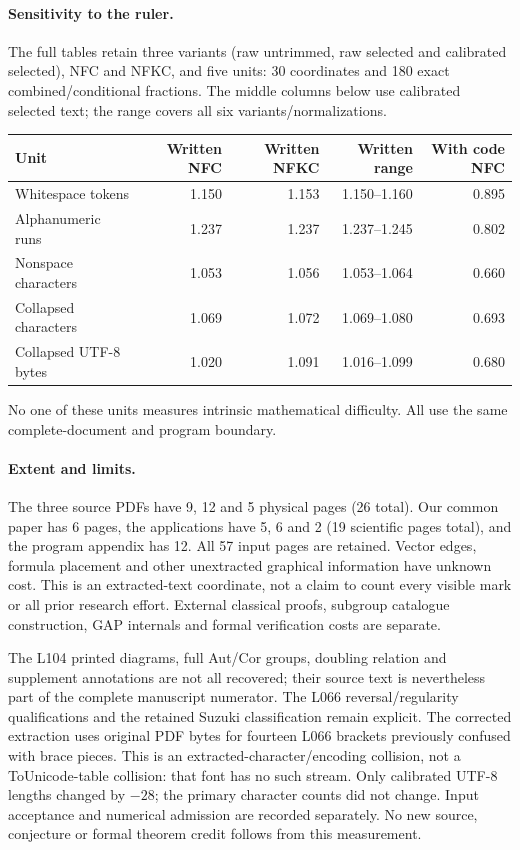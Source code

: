 \documentclass[11pt,a4paper]{article}
\begin{document}
\paragraph{Sensitivity to the ruler.}
The full tables retain three variants (raw untrimmed, raw selected and
calibrated selected), NFC and NFKC, and five units: 30 coordinates and
180 exact combined/conditional fractions. The middle columns below use
calibrated selected text; the range covers all six variants/normalizations.
\begin{center}\small\begin{tabular}{p{.29\linewidth}rrrr}\toprule
Unit & Written NFC & Written NFKC & Written range & With code NFC\\\midrule
Whitespace tokens & 1.150 & 1.153 & 1.150--1.160 & 0.895\\
Alphanumeric runs & 1.237 & 1.237 & 1.237--1.245 & 0.802\\
Nonspace characters & 1.053 & 1.056 & 1.053--1.064 & 0.660\\
Collapsed characters & 1.069 & 1.072 & 1.069--1.080 & 0.693\\
Collapsed UTF-8 bytes & 1.020 & 1.091 & 1.016--1.099 & 0.680\\
\bottomrule\end{tabular}\end{center}
No one of these units measures intrinsic mathematical difficulty. All use the
same complete-document and program boundary.

\paragraph{Extent and limits.}
The three source PDFs have 9, 12 and 5 physical pages (26 total). Our common
paper has 6 pages, the applications have 5, 6 and 2 (19 scientific pages total),
and the program appendix has 12. All 57 input pages are retained. Vector edges,
formula placement and other unextracted graphical information have unknown
cost. This is an extracted-text coordinate, not a claim to count every visible
mark or all prior research effort. External classical proofs, subgroup catalogue
construction, GAP internals and formal verification costs are separate.

The L104 printed diagrams, full Aut/Cor groups, doubling relation and supplement
annotations are not all recovered; their source text is nevertheless part of
the complete manuscript numerator. The L066 reversal/regularity qualifications
and the retained Suzuki classification remain explicit. The corrected extraction
uses original PDF bytes for fourteen L066 brackets previously confused with
brace pieces. This is an extracted-character/encoding collision, not a
ToUnicode-table collision: that font has no such stream. Only calibrated UTF-8
lengths changed by $-28$; the primary character counts did not change.
Input acceptance and numerical admission are recorded separately. No new
source, conjecture or formal theorem credit follows from this measurement.
\end{document}
